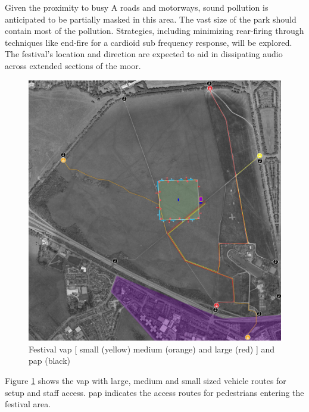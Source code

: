         Given the proximity to busy A roads and motorways, sound pollution is anticipated to be partially masked in this area. The vast size of the park should contain most of the pollution. Strategies, including minimizing rear-firing through techniques like end-fire for a cardioid sub frequency response, will be explored. The festival's location and direction are expected to aid in dissipating audio across extended sections of the moor.
        
        \begin{figure}[H]
            \centering
            \includegraphics[width=\textwidth]{Images/festival_vap_pap.jpg}
            \caption{Festival \gls{vap} [ small (yellow) medium (orange) and large (red) ] and \gls{pap} (black)}
            \label{fig:festival_vap_pap}
        \end{figure}

        Figure \ref{fig:festival_vap_pap} shows the \gls{vap} with large, medium and small sized vehicle routes for setup and staff access. \gls{pap} indicates the access routes for pedestrians entering the festival area.

